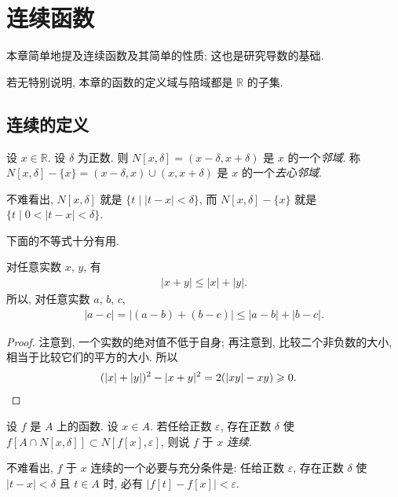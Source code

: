 \chapter{连续函数}

本章简单地提及连续函数及其简单的性质; 这也是研究导数的基础.

若无特别说明, 本章的函数的定义域与陪域都是 $\mathbb{R}$ 的子集.

\section{连续的定义}

\begin{definition}
    设 $x \in \mathbb{R}$. 设 $\delta$ 为正数. 则 $N[x, \delta] = (x - \delta, x + \delta)$ 是 $x$ 的一个\emph{邻域}. 称 $N[x, \delta] - \{ x \} = (x - \delta, x) \cup (x, x + \delta)$ 是 $x$ 的一个\emph{去心邻域}.
\end{definition}

不难看出, $N[x, \delta]$ 就是 $\{ t \mid |t - x| < \delta \}$, 而 $N[x, \delta] - \{ x \}$ 就是 $\{ t \mid 0 < |t - x| < \delta \}$.

下面的不等式十分有用.

\begin{theorem}
    对任意实数 $x$, $y$, 有
    \begin{align*}
        |x + y| \leq |x| + |y|.
    \end{align*}
    所以, 对任意实数 $a$, $b$, $c$,
    \begin{align*}
        |a - c| = |(a - b) + (b - c)| \leq |a - b| + |b - c|.
    \end{align*}
\end{theorem}

\begin{proof}
    注意到, 一个实数的绝对值不低于自身; 再注意到, 比较二个非负数的大小, 相当于比较它们的平方的大小. 所以
    \begin{align*}
         & {(|x| + |y|)^2 - |x + y|^2 = 2(|xy| - xy) \geq 0.} \qedhere
    \end{align*}
\end{proof}

\begin{definition}
    设 $f$ 是 $A$ 上的函数. 设 $x \in A$. 若任给正数 $\varepsilon$, 存在正数 $\delta$ 使 $f[A \cap N[x, \delta]] \subset N[f[x], \varepsilon]$, 则说 $f$ 于 $x$ \emph{连续}.
\end{definition}

不难看出, $f$ 于 $x$ 连续的一个必要与充分条件是: 任给正数 $\varepsilon$, 存在正数 $\delta$ 使 $|t - x| < \delta$ 且 $t \in A$ 时, 必有 $|f[t] - f[x]| < \varepsilon$.

